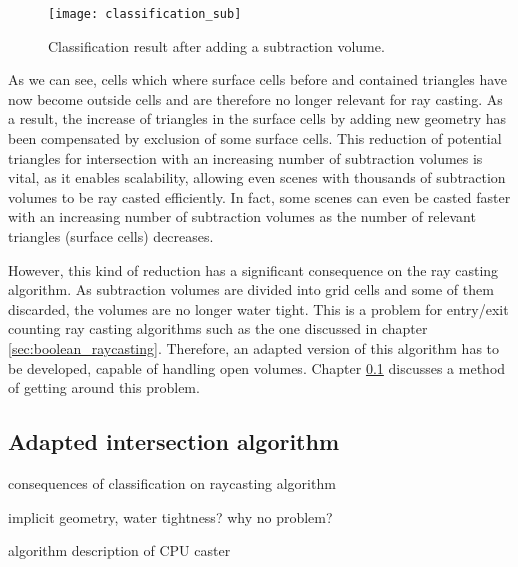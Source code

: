 \begin{figure}
\centering
\texttt{[image: classification\_sub]}
\caption{Classification result after adding a subtraction volume. }
\label{fig:classification_sub}
\end{figure}

As we can see, cells which where surface cells before and contained triangles have now become outside cells and are therefore no longer relevant for ray casting. As a result, the increase of triangles in the surface cells by adding new geometry has been compensated by exclusion of some surface cells. This reduction of potential triangles for intersection with an increasing number of subtraction volumes is vital, as it enables scalability, allowing even scenes with thousands of subtraction volumes to be ray casted efficiently. In fact, some scenes can even be casted faster with an increasing number of subtraction volumes as the number of relevant triangles (surface cells) decreases.

However, this kind of reduction has a significant consequence on the ray casting algorithm. As subtraction volumes are divided into grid cells and some of them discarded, the volumes are no longer water tight. This is a problem for entry/exit counting ray casting algorithms such as the one discussed in chapter \ref{sec:boolean_raycasting}. Therefore, an adapted version of this algorithm has to be developed, capable of handling open volumes. Chapter \ref{sec:adapted_ray_casting} discusses a method of getting around this problem.


\subsection{Adapted intersection algorithm}
\label{sec:adapted_ray_casting}

consequences of classification on raycasting algorithm

implicit geometry, water tightness? why no problem?

algorithm description of CPU caster
